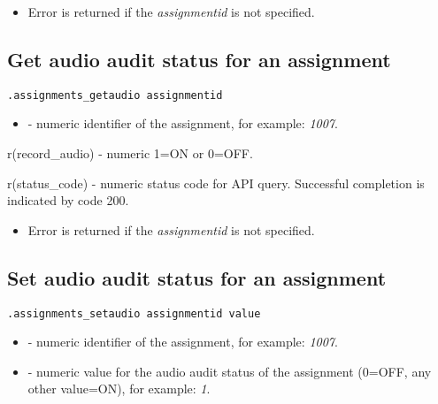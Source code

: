 \errheader
\begin{itemize}
    \item Error  is returned if the \textit{assignmentid} is not specified.
\end{itemize}


\subsection{Get audio audit status for an assignment}

\begin{lstlisting}[style=CommandLineStyle]
.assignments_getaudio assignmentid
\end{lstlisting}

\paramsheader
\begin{itemize}
    \item {} - numeric identifier of the assignment, for example: \textit{1007}.
\end{itemize}

\savedres
\begin{compactitem}
    \item r(record\_audio) - numeric 1=ON or 0=OFF.
    \item r(status\_code)  - numeric status code for API query. Successful completion is indicated by code 200.
\end{compactitem}

\errheader
\begin{itemize}
    \item Error  is returned if the \textit{assignmentid} is not specified.
\end{itemize}

\subsection{Set audio audit status for an assignment}

\begin{lstlisting}[style=CommandLineStyle]
.assignments_setaudio assignmentid value
\end{lstlisting}

\paramsheader
\begin{itemize}
    \item {} - numeric identifier of the assignment, for example: \textit{1007}.
    \item {} - numeric value for the audio audit status of the assignment (0=OFF, any other value=ON), for example: \textit{1}.

\end{itemize}

